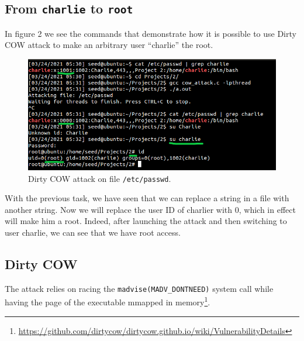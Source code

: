 \documentclass[12pt,reqno]{amsart}
\newcommand{\code}[1]{\texttt{#1}}
\begin{document}
\subsection{From \code{charlie} to \code{root}}

In figure 2 we see the commands that demonstrate how it is possible to use Dirty COW attack to make an arbitrary user ``charlie'' the root. 

\begin{figure}[h]
  \label{fig:charlie}
  \includegraphics[width=\linewidth]{img/part3.png}
  \caption{Dirty COW attack on file \code{/etc/passwd}.}
\end{figure}

With the previous task, we have seen that we can replace a string in a file with another string. Now we will replace the user ID of charlier with 0, which in effect will make him a root. Indeed, after launching the attack and then switching to user charlie, we can see that we have root access.

\subsection{Dirty COW}
The attack relies on racing the \code{madvise(MADV\_DONTNEED)} system call while having the page of the executable mmapped in memory\footnote{\url{https://github.com/dirtycow/dirtycow.github.io/wiki/VulnerabilityDetails}}.
\end{document}
